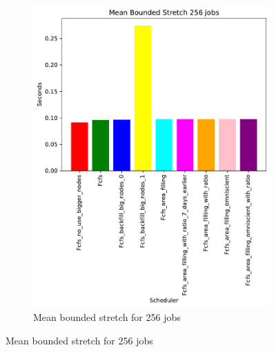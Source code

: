 \documentclass[a4paper]{article}
\begin{document}
\begin{figure}[H]
\begin{subfigure}[b]{0.4\linewidth}\centering\includegraphics[width=0.95\linewidth]{MBSS/plot/Size_Constraint_2022-01-17->2022-01-17_V9532_Mean_Stretch_With_a_Minimum_256_450_128_32_256_4_1024.pdf}\caption{Mean bounded stretch for 256 jobs}\label{45}\end{subfigure}

\end{figure}
\end{document}
